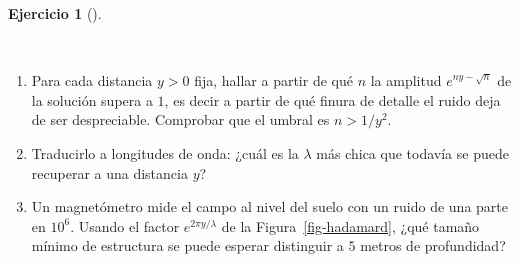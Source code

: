 \documentclass[
  spanish,
  a4paper,
]{scrbook}
\providecommand{\tightlist}{%
  \setlength{\itemsep}{0pt}\setlength{\parskip}{0pt}}
\theoremstyle{definition}
\theoremstyle{plain}
\theoremstyle{definition}
\theoremstyle{plain}
\theoremstyle{definition}
\newtheorem{exercise}{Ejercicio}[chapter]
\theoremstyle{remark}
\begin{document}
\begin{exercise}[]\protect\hypertarget{exr-hadamard-umbral}{}\label{exr-hadamard-umbral}

~

\begin{enumerate}
\def\labelenumi{\alph{enumi}.}
\tightlist
\item
  Para cada distancia \(y>0\) fija, hallar a partir de qué \(n\) la
  amplitud \(e^{ny-\sqrt n}\) de la solución supera a \(1\), es decir a
  partir de qué finura de detalle el ruido deja de ser despreciable.
  Comprobar que el umbral es \(n > 1/y^{2}\).
\item
  Traducirlo a longitudes de onda: ¿cuál es la \(\lambda\) más chica que
  todavía se puede recuperar a una distancia \(y\)?
\item
  Un magnetómetro mide el campo al nivel del suelo con un ruido de una
  parte en \(10^{6}\). Usando el factor \(e^{2\pi y/\lambda}\) de la
  Figura~\ref{fig-hadamard}, ¿qué tamaño mínimo de estructura se puede
  esperar distinguir a \(5\) metros de profundidad?
\end{enumerate}

\end{exercise}
\end{document}
